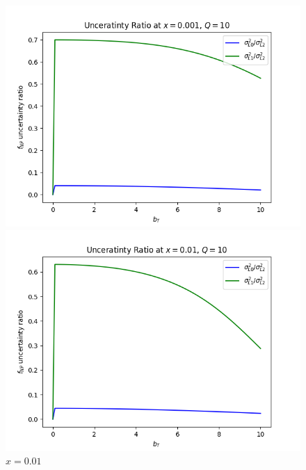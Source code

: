\documentclass{article}
\begin{document}
\begin{itemize}
    \begin{figure}[H]
    \centering
    \begin{minipage}{0.45\textwidth}
        \centering
        \includegraphics[width=\textwidth]{Images/unc_ratios/unc_ratio_f_NP_Q_10_x_0.001.png}
        \caption{$x = 0.001$}
    \end{minipage}\hfill
    \begin{minipage}{0.45\textwidth}
        \centering
        \includegraphics[width=\textwidth]{Images/unc_ratios/unc_ratio_f_NP_Q_10_x_0.01.png}
        \caption{$x=0.01$}
    \end{minipage}
    \begin{minipage}{0.45\textwidth}
        \centering

\end{minipage}
\end{figure}
\end{itemize}
\end{document}
